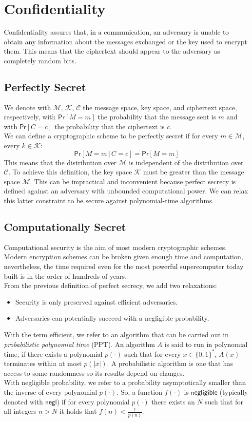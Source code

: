 \section{Confidentiality}
Confidentiality assures that, in a communication, an adversary is unable to obtain any information about the messages exchanged or the key used to encrypt them. This means that the ciphertext should appear to the adversary as completely random bits.
\subsection{Perfectly Secret}
We denote with $\mathcal{M}$, $\mathcal{K}$, $\mathcal{C}$ the message space, key space, and ciphertext space, respectively,  with $\mathsf{Pr}[M = m]$ the probability that the message sent is $m$ and with $\mathsf{Pr}[C = c]$ the probability that the ciphertext is $c$.\\
We can define a cryptographic scheme to be perfectly secret if for every $m \in \mathcal{M}$, every $k \in \mathcal{K}$:
$$
    \mathsf{Pr}[M = m \, | \, C = c] = \mathsf{Pr}[M = m]
$$
This means that the distribution over $\mathcal{M}$ is independent of the distribution over $\mathcal{C}$.
To achieve this definition, the key space $\mathcal{K}$ must be greater than the message space $\mathcal{M}$. This can be impractical and inconvenient because perfect secrecy is defined against an adversary with unbounded computational power. We can relax this latter constraint to be secure against polynomial-time algorithms.

\subsection{Computationally Secret}
Computational security is the aim of most modern cryptographic schemes. Modern encryption schemes can be broken given enough time and computation, nevertheless, the time required even for the most powerful supercomputer today built is in the order of hundreds of years.\\
From the previous definition of perfect secrecy, we add two relaxations:
\begin{itemize}
    \item{Security is only preserved against efficient adversaries.}
    \item{Adversaries can potentially succeed with a negligible probability.}
\end{itemize}
With the term efficient, we refer to an algorithm that can be carried out in \emph{probabilistic polynomial time} (PPT). An algorithm $\mathit{A}$ is said to run in polynomial time, if there exists a polynomial $p(\cdot)$ such that for every $x \in \{0, 1\}^*$, $\mathit{A}(x)$ terminates within at most $p(|x|)$. A probabilistic algorithm is one that has access to some randomness so its results depend on changes.\\
With negligible probability, we refer to a probability asymptotically smaller than the inverse of every polynomial $p(\cdot)$.
So, a function $f(\cdot)$ is $\mathsf{negligible}$ (typically denoted with $\mathsf{negl}$) if for every polynomial $p(\cdot)$ there exists an $N$ such that for all integers $n > N$ it holds that $f(n) < \frac{1}{p(n)}$.


